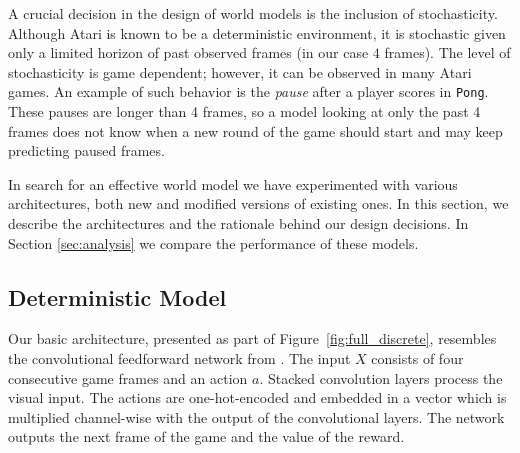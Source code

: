 
A crucial decision in the design of world models   %
is the inclusion of stochasticity. Although Atari is known to be a deterministic environment, it is stochastic given only a limited horizon of past observed frames (in our case $4$ frames). The level of stochasticity is game dependent; however, it can be observed in many Atari games. An example of such behavior is the \textit{pause} after a player scores in \texttt{Pong}. These pauses are longer than 4 frames, so a model looking at only the past 4 frames does not know when a new round of the game should start and may keep predicting paused frames.

In search for an effective world model we have experimented with various architectures, both new and modified versions of existing ones. In this section, we describe the architectures and the rationale behind our design decisions.  In Section \ref{sec:analysis} we compare the performance of these models.



\subsection{Deterministic Model}
Our basic architecture, presented as part of Figure~\ref{fig:full_discrete}, resembles the convolutional feedforward network from \citet{video_prediction}.  The input $X$ consists of four consecutive game frames and an action $a$. Stacked convolution layers process the visual input. The actions are one-hot-encoded and embedded in a vector which is multiplied channel-wise with the output of the convolutional layers. 
The network outputs the next frame of the game and the value of the reward.%


